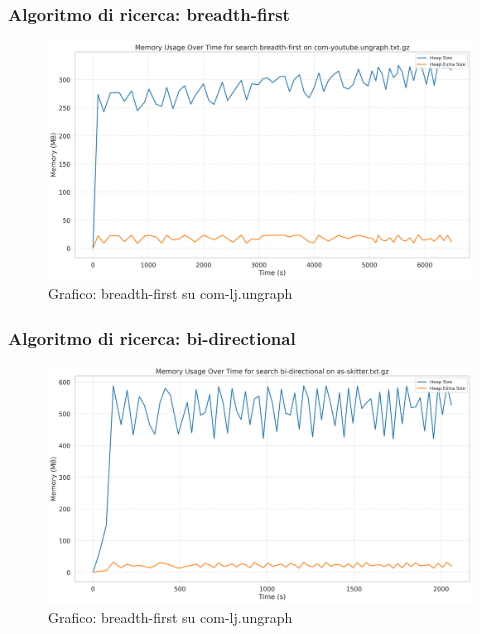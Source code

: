 \documentclass{article}
\begin{document}
\subsubsection{Algoritmo di ricerca: breadth-first}
\begin{figure}[h]\centering
\includegraphics[width=\textwidth]{../plots/com-youtube.ungraph_breadth-first.png}
\caption{Grafico: breadth-first su com-lj.ungraph}
\end{figure}
\subsubsection{Algoritmo di ricerca: bi-directional}
\begin{figure}[h]\centering
\includegraphics[width=\textwidth]{../plots/as-skitter_bi-directional.png}
\caption{Grafico: breadth-first su com-lj.ungraph}
\end{figure}
\end{document}
